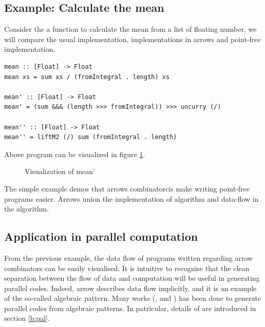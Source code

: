 \subsection{Example: Calculate the mean}
Consider the a function to calculate the mean from a list of floating number, we will compare the usual implementation, implementations in arrows and point-free implementation.
\begin{verbatim}
mean :: [Float] -> Float
mean xs = sum xs / (fromIntegral . length) xs

mean' :: [Float] -> Float
mean' = (sum &&& (length >>> fromIntegral)) >>> uncurry (/)

mean'' :: [Float] -> Float
mean'' = liftM2 (/) sum (fromIntegral . length)
\end{verbatim}
Above program can be visualized in figure \ref{b:ar:p2}.
\begin{figure}[ht]
  \centering
  \caption{Visualization of mean'}\label{b:ar:p2}
\end{figure}
The simple example demos that arrows combinatorcis make writing point-free programs easier. Arrows union the implementation of algorithm and data-flow in the algorithm. 

\subsection{Application in parallel computation}
From the previous example, the data flow of programs written regarding arrow combinators can be easily visualised. It is intuitive to recognise that the clean separation between the flow of data and computation will be useful in generating parallel codes. Indeed, arrow describes data flow implicitly, and it is an example of the so-called algebraic pattern. Many works (\cite{braunArrowsParallelComputation2018}, \cite{elliottGenericFunctionalParallel2017b} and \cite{authorAlgebraicMultipartyProtocol2018}) has been done to generate parallel codes from algebraic patterns.
In patricular, details of \cite{authorAlgebraicMultipartyProtocol2018} are introduced in section \ref{b:pal}.

